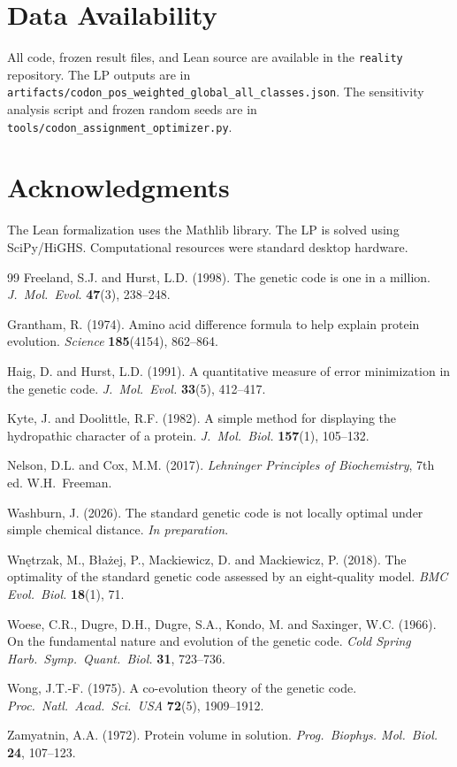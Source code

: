 \documentclass[11pt,twocolumn]{article}
\begin{document}
\section*{Data Availability}

All code, frozen result files, and Lean source are available in the
\texttt{reality} repository. The LP outputs are in
\texttt{artifacts/codon\_pos\_weighted\_global\_all\_classes.json}.
The sensitivity analysis script and frozen random seeds are in
\texttt{tools/codon\_assignment\_optimizer.py}.

\section*{Acknowledgments}

The Lean formalization uses the Mathlib library. The LP is solved using
SciPy/HiGHS. Computational resources were standard desktop hardware.

\begin{thebibliography}{99}
Freeland, S.J. and Hurst, L.D. (1998). The genetic code is one in a
million. \textit{J.~Mol.~Evol.} \textbf{47}(3), 238--248.

Grantham, R. (1974). Amino acid difference formula to help explain protein
evolution. \textit{Science} \textbf{185}(4154), 862--864.

Haig, D. and Hurst, L.D. (1991). A quantitative measure of error
minimization in the genetic code. \textit{J.~Mol.~Evol.} \textbf{33}(5),
412--417.

Kyte, J. and Doolittle, R.F. (1982). A simple method for displaying the
hydropathic character of a protein. \textit{J.~Mol.~Biol.} \textbf{157}(1),
105--132.

Nelson, D.L. and Cox, M.M. (2017). \textit{Lehninger Principles of
Biochemistry}, 7th ed. W.H.~Freeman.

Washburn, J. (2026). The standard genetic code is not locally optimal
under simple chemical distance. \textit{In preparation}.

Wnętrzak, M., Błażej, P., Mackiewicz, D. and Mackiewicz, P. (2018).
The optimality of the standard genetic code assessed by an eight-quality
model. \textit{BMC Evol.~Biol.} \textbf{18}(1), 71.

Woese, C.R., Dugre, D.H., Dugre, S.A., Kondo, M. and Saxinger, W.C.
(1966). On the fundamental nature and evolution of the genetic code.
\textit{Cold Spring Harb.~Symp.~Quant.~Biol.} \textbf{31}, 723--736.

Wong, J.T.-F. (1975). A co-evolution theory of the genetic code.
\textit{Proc.~Natl.~Acad.~Sci.~USA} \textbf{72}(5), 1909--1912.

Zamyatnin, A.A. (1972). Protein volume in solution. \textit{Prog.~Biophys.
Mol.~Biol.} \textbf{24}, 107--123.
\end{thebibliography}
\end{document}
